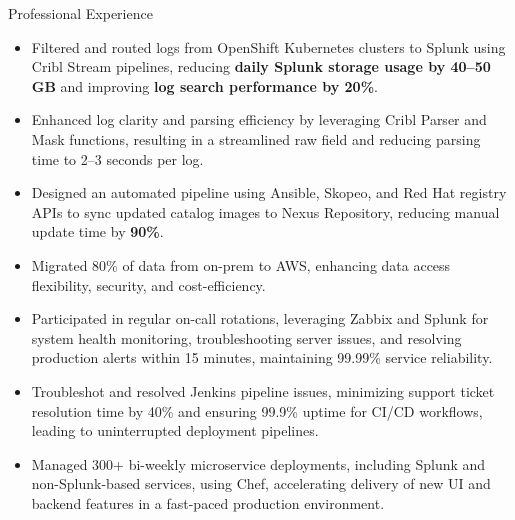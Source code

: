 \documentclass{resume}
\begin{document}
\begin{experienceSection}{Professional Experience}
    \experienceItem[
        company={Arch Mortgage Insurance},
        location={Greensboro, NC},
        position={IT-Infrastructure-Platform/SRE Intern},
        duration={Jun 2024 - Aug 2024}
    ]
    \begin{itemize}
        \itemsep -6pt {}
        \item Filtered and routed logs from OpenShift Kubernetes clusters to Splunk using Cribl Stream pipelines, reducing \textbf{daily Splunk storage usage by 40–50 GB} and improving \textbf{log search performance by 20\%}.
        \item Enhanced log clarity and parsing efficiency by leveraging Cribl Parser and Mask functions, resulting in a streamlined raw field and reducing parsing time to 2–3 seconds per log.
        \item Designed an automated pipeline using Ansible, Skopeo, and Red Hat registry APIs to sync updated catalog images to Nexus Repository, reducing manual update time by\textbf{ 90\%}.
        
    \end{itemize}

    \experienceItem[
        company={Cerner Healthcare},
        location={Bangalore, India},
        position={System Engineer - 1},
        duration={May 2021 - Jul 2023}
    ]
    \begin{itemize}
        \itemsep -6pt {}
        \item Migrated 80\% of data from on-prem to AWS, enhancing data access flexibility, security, and cost-efficiency.
        \item Participated in regular on-call rotations, leveraging Zabbix and Splunk for system health monitoring, troubleshooting server issues, and resolving production alerts within 15 minutes, maintaining 99.99\% service reliability.
        \item Troubleshot and resolved Jenkins pipeline issues, minimizing support ticket resolution time by 40\% and ensuring 99.9\% uptime for CI/CD workflows, leading to uninterrupted deployment pipelines.
        \item Managed 300+ bi-weekly microservice deployments, including Splunk and non-Splunk-based services, using Chef, accelerating delivery of new UI and backend features in a fast-paced production environment.
    \end{itemize}

\end{experienceSection}
\end{document}

